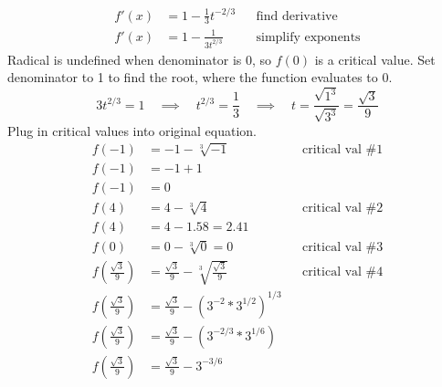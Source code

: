 \documentclass{article}
\begin{document}
\begin{description}
\begin{description}
\begin{align*}
                        f'(x) & = 1 - \frac{1}{3}t^{-2/3} &  & \text{find derivative}                 \\[1em]
                        f'(x) & = 1 - \frac{1}{3t^{2/3}}  &  & \text{simplify exponents}
                    \end{align*}
                    Radical is undefined when denominator is 0, so $f(0)$ is a critical value. Set denominator to 1 to find the root, where the function evaluates to 0.
                    \[3t^{2/3} = 1 \quad \implies \quad t^{2/3} = \frac{1}{3}\quad \implies \quad t = \frac{\sqrt{1^3}}{\sqrt{3^3}} = \frac{\sqrt{3}}{9}\]
                    Plug in critical values  into original equation.
                    \begin{align*}
                        f(-1)                            & = -1 - \sqrt[3]{-1}                                      &  & \text{critical val \#1} \\
                        f(-1)                            & = -1 + 1                                                                              \\
                        f(-1)                            & = 0                                                                                   \\[2em]
                        f(4)                             & = 4 - \sqrt[3]{4}                                        &  & \text{critical val \#2} \\
                        f(4)                             & = 4 - 1.58 = 2.41                                                                     \\[2em]
                        f(0)                             & = 0 - \sqrt[3]{0} = 0                                    &  & \text{critical val \#3} \\[2em]
                        f\left(\frac{\sqrt{3}}{9}\right) & = \frac{\sqrt{3}}{9} - \sqrt[3]{\frac{\sqrt{3}}{9}}      &  & \text{critical val \#4} \\[1em]
                        f\left(\frac{\sqrt{3}}{9}\right) & = \frac{\sqrt{3}}{9} - \left(3^{-2}*3^{1/2}\right)^{1/3}                              \\[1em]
                        f\left(\frac{\sqrt{3}}{9}\right) & = \frac{\sqrt{3}}{9} - \left(3^{-2/3} * 3 ^ {1/6}\right)                              \\[1em]
                        f\left(\frac{\sqrt{3}}{9}\right) & = \frac{\sqrt{3}}{9} - 3^{-3/6}                                                       \\[1em]

\end{align*}
\end{description}
\end{description}
\end{document}
